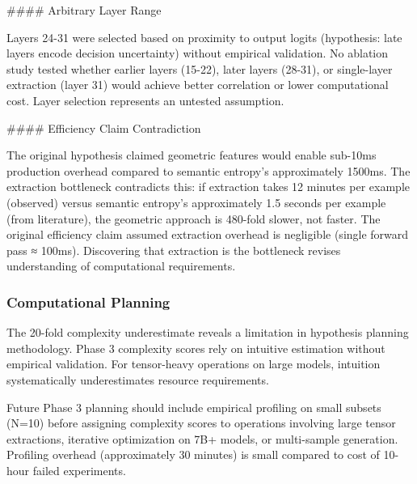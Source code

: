 \#\#\#\# Arbitrary Layer Range

Layers 24-31 were selected based on proximity to output logits (hypothesis: late layers encode decision uncertainty) without empirical validation. No ablation study tested whether earlier layers (15-22), later layers (28-31), or single-layer extraction (layer 31) would achieve better correlation or lower computational cost. Layer selection represents an untested assumption.

\#\#\#\# Efficiency Claim Contradiction

The original hypothesis claimed geometric features would enable sub-10ms production overhead compared to semantic entropy's approximately 1500ms. The extraction bottleneck contradicts this: if extraction takes 12 minutes per example (observed) versus semantic entropy's approximately 1.5 seconds per example (from literature), the geometric approach is 480-fold slower, not faster. The original efficiency claim assumed extraction overhead is negligible (single forward pass ≈ 100ms). Discovering that extraction is the bottleneck revises understanding of computational requirements.

\subsubsection{Computational Planning}

The 20-fold complexity underestimate reveals a limitation in hypothesis planning methodology. Phase 3 complexity scores rely on intuitive estimation without empirical validation. For tensor-heavy operations on large models, intuition systematically underestimates resource requirements.

Future Phase 3 planning should include empirical profiling on small subsets (N=10) before assigning complexity scores to operations involving large tensor extractions, iterative optimization on 7B+ models, or multi-sample generation. Profiling overhead (approximately 30 minutes) is small compared to cost of 10-hour failed experiments.
